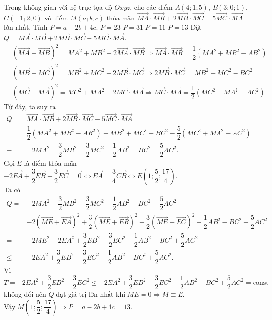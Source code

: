 \begin{ex}%
	Trong không gian với hệ trục tọa độ $Oxyz$, cho các điểm $A(4;1;5)$, $B(3;0;1)$, $C(-1;2;0)$ và điểm $ M(a;b;c)$ thỏa mãn $\overrightarrow{MA}\cdot\overrightarrow{MB}+2\overrightarrow{MB}\cdot\overrightarrow{MC}-5\overrightarrow{MC}\cdot\overrightarrow{MA}$ lớn nhất. Tính $P=a-2b+4c$.
	\choice
	{$P=23$}
	{$P=31$}
	{$P=11$}
	{\True $P=13$}
	\loigiai
	{Đặt  $Q=\overrightarrow{MA}\cdot\overrightarrow{MB}+2\overrightarrow{MB}\cdot\overrightarrow{MC}-5\overrightarrow{MC}\cdot\overrightarrow{MA}$.
		\begin{align*}	&\left(\overrightarrow{MA}-\overrightarrow{MB}\right)^2=MA^2+MB^2-2\overrightarrow{MA}\cdot\overrightarrow{MB}\Rightarrow\overrightarrow{MA}\cdot\overrightarrow{MB}=\dfrac{1}{2}\left(MA^2+MB^2-AB^2\right)\\		&\left(\overrightarrow{MB}-\overrightarrow{MC}\right)^2=MB^2+MC^2-2\overrightarrow{MB}\cdot\overrightarrow{MC}\Rightarrow 2\overrightarrow{MB}\cdot\overrightarrow{MC}=MB^2+MC^2-BC^2\\
			&\left(\overrightarrow{MC}-\overrightarrow{MA}\right)^2=MC^2+MA^2-2\overrightarrow{MC}\cdot\overrightarrow{MA}\Rightarrow\overrightarrow{MC}\cdot\overrightarrow{MA}=\dfrac{1}{2}\left(MC^2+MA^2-AC^2\right).\end{align*}
		Từ đây, ta suy ra 
		\begin{align*} Q=&\overrightarrow{MA}\cdot\overrightarrow{MB}+2\overrightarrow{MB}\cdot\overrightarrow{MC}-5\overrightarrow{MC}\cdot\overrightarrow{MA}\\
			=&\dfrac{1}{2}\left(MA^2+MB^2-AB^2\right)+MB^2+MC^2-BC^2-\dfrac{5}{2}\left(MC^2+MA^2-AC^2\right)\\ =&-2MA^2+\dfrac{3}{2}MB^2-\dfrac{3}{2}MC^2-\dfrac{1}{2}AB^2-BC^2+\dfrac{5}{2}AC^2.\end{align*}
		Gọi $ E$ là điểm thỏa mãn $-2\overrightarrow{EA}+\dfrac{3}{2}\overrightarrow{EB}-\dfrac{3}{2}\overrightarrow{EC}=\overrightarrow{0}\Leftrightarrow\overrightarrow{EA}=\dfrac{3}{4}\overrightarrow{CB}\Leftrightarrow E\left(1;\dfrac{5}{2};\dfrac{17}{4}\right)$.\\
		
		Ta có 
		\begin{align*} Q=&-2MA^2+\dfrac{3}{2}MB^2-\dfrac{3}{2}MC^2-\dfrac{1}{2}AB^2-BC^2+\dfrac{5}{2}AC^2\\
			=&-2\left(\overrightarrow{ME}+\overrightarrow{EA}\right)^2+\dfrac{3}{2}\left(\overrightarrow{ME}+\overrightarrow{EB}\right)^2-\dfrac{3}{2}\left(\overrightarrow{ME}+\overrightarrow{EC}\right)^2-\dfrac{1}{2}AB^2-BC^2+\dfrac{5}{2}AC^2\\
			=&-2ME^2-2EA^2+\dfrac{3}{2}EB^2-\dfrac{3}{2}EC^2-\dfrac{1}{2}AB^2-BC^2+\dfrac{5}{2}AC^2\\
			\leq&-2EA^2+\dfrac{3}{2}EB^2-\dfrac{3}{2}EC^2-\dfrac{1}{2}AB^2-BC^2+\dfrac{5}{2}AC^2.
		\end{align*}
		Vì $T=-2EA^2+\dfrac{3}{2}EB^2-\dfrac{3}{2}EC^2\le-2EA^2+\dfrac{3}{2}EB^2-\dfrac{3}{2}EC^2-\dfrac{1}{2}AB^2-BC^2+\dfrac{5}{2}AC^2=\text{const}$ không đổi nên $Q$ đạt giá trị lớn nhất khi $ME=0\Rightarrow M\equiv E$.\\
		Vậy $M\left(1;\dfrac{5}{2};\dfrac{17}{4}\right)\Rightarrow P=a-2b+4c=13$.}
\end{ex}

